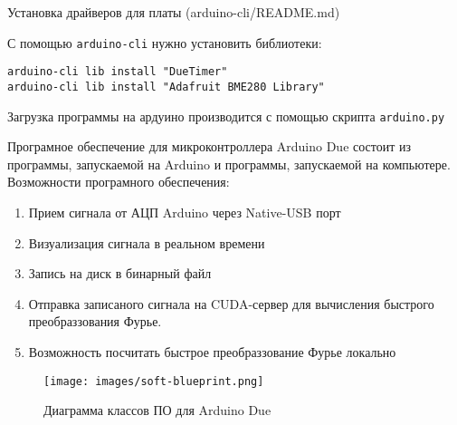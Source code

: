 \documentclass[../main.tex]{subfiles}
\begin{document}
Установка драйверов для платы (arduino-cli/README.md)

С помощью \texttt{arduino-cli} нужно установить библиотеки:

\begin{lstlisting}
arduino-cli lib install "DueTimer"
arduino-cli lib install "Adafruit BME280 Library"
\end{lstlisting}


Загрузка программы на ардуино производится с помощью скрипта \texttt{arduino.py}




Програмное обеспечение для микроконтроллера Arduino Due состоит из программы, запускаемой на Arduino и программы, запускаемой на компьютере. 
Возможности програмного обеспечения:
\begin{enumerate}
  \item Прием сигнала от АЦП Arduino через Native-USB порт
  \item Визуализация сигнала в реальном времени
  \item Запись на диск в бинарный файл
  \item Отправка записаного сигнала на CUDA-сервер для вычисления быстрого преобраззования Фурье.
  \item Возможность посчитать быстрое преобраззование Фурье локально
\end{enumerate}

\begin{figure}[H]
\centering
\texttt{[image: images/soft-blueprint.png]}
\caption{Диаграмма классов ПО для Arduino Due}
\end{figure}
\end{document}
